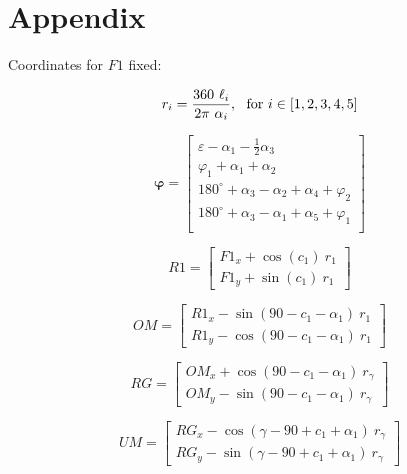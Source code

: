 \documentclass[10pt,a4paper]{article}
\begin{document}
\appendix
\section{Appendix}

\begin{multicols}{2}

Coordinates for $F1$ fixed:

\begin{equation}
r_i = \frac{360 ~ \ell_i}{2 \pi ~ \alpha_i},~~ \textnormal{for}~ i \in [1,2,3,4,5]
\end{equation}

\begin{equation}
\bm{\varphi} = \begin{bmatrix}
\varepsilon - \alpha_1 - \frac{1}{2}\alpha_3 \\
\varphi_1 + \alpha_1 + \alpha_2 \\
180^\circ + \alpha_3 - \alpha_2 + \alpha_4 + \varphi_2 \\
180^\circ + \alpha_3 - \alpha_1 + \alpha_5 + \varphi_1 \\
\end{bmatrix}
\label{eq:phi_calc}
\end{equation}


\begin{equation}
\label{eq:F1_start}
R1 =  \begin{bmatrix} 
F1_x +\cos(c_1)~r_1 \\ 
F1_y + \sin(c_1)~r_1\end{bmatrix}
\end{equation}

\begin{equation}
OM =  \begin{bmatrix} 
R1_x - \sin(90-c_1-\alpha_1)~r_1 \\ 
R1_y - \cos(90-c_1-\alpha_1)~r_1 \end{bmatrix}
\end{equation}

\begin{equation}
RG =  \begin{bmatrix} 
OM_x + \cos(90-c_1-\alpha_1)~r_\gamma \\ 
OM_y - \sin(90-c_1-\alpha_1)~r_\gamma \end{bmatrix}
\end{equation}

\begin{equation}
UM =  \begin{bmatrix} 
RG_x - \cos(\gamma - 90 + c_1 + \alpha_1)~r_\gamma \\ 
RG_y - \sin(\gamma - 90 + c_1 + \alpha_1)~r_\gamma \end{bmatrix}
\end{equation}


\end{multicols}
\end{document}
